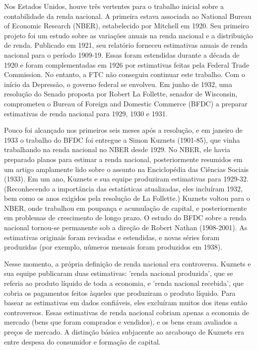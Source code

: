 \documentclass[12pt]{article}
\begin{document}
Nos Estados Unidos, houve três vertentes para o trabalho inicial sobre a contabilidade da renda nacional. A primeira estava associada ao National Bureau of Economic Research (NBER), estabelecido por Mitchell em 1920. Seu primeiro projeto foi um estudo sobre as variações anuais na renda nacional e a distribuição de renda. Publicado em 1921, seu relatório forneceu estimativas anuais de renda nacional para o período 1909-19. Essas foram estendidas durante a década de 1920 e foram complementadas em 1926 por estimativas feitas pela Federal Trade Commission. No entanto, a FTC não conseguiu continuar este trabalho. Com o início da Depressão, o governo federal se envolveu. Em junho de 1932, uma resolução do Senado proposta por Robert La Follette, senador de Wisconsin, comprometeu o Bureau of Foreign and Domestic Commerce (BFDC) a preparar estimativas de renda nacional para 1929, 1930 e 1931.

Pouco foi alcançado nos primeiros seis meses após a resolução, e em janeiro de 1933 o trabalho do BFDC foi entregue a Simon Kuznets (1901-85), que vinha trabalhando na renda nacional no NBER desde 1929. No NBER, ele havia preparado planos para estimar a renda nacional, posteriormente resumidos em um artigo amplamente lido sobre o assunto na Enciclopédia das Ciências Sociais (1933). Em um ano, Kuznets e sua equipe produziram estimativas para 1929-32. (Reconhecendo a importância das estatísticas atualizadas, eles incluíram 1932, bem como os anos exigidos pela resolução de La Follette.) Kuznets voltou para o NBER, onde trabalhou em poupança e acumulação de capital, e posteriormente em problemas de crescimento de longo prazo. O estudo do BFDC sobre a renda nacional tornou-se permanente sob a direção de Robert Nathan (1908-2001). As estimativas originais foram revisadas e estendidas, e novas séries foram produzidas (por exemplo, números mensais foram produzidos em 1938).

Nesse momento, a própria definição de renda nacional era controversa. Kuznets e sua equipe publicaram duas estimativas: 'renda nacional produzida', que se referia ao produto líquido de toda a economia, e 'renda nacional recebida', que cobria os pagamentos feitos àqueles que produziram o produto líquido. Para basear as estimativas em dados confiáveis, eles excluíram muitos dos itens então controversos. Essas estimativas de renda nacional cobriam apenas a economia de mercado (bens que foram comprados e vendidos), e os bens eram avaliados a preços de mercado. A distinção básica subjacente ao arcabouço de Kuznets era entre despesa do consumidor e formação de capital.
\end{document}
